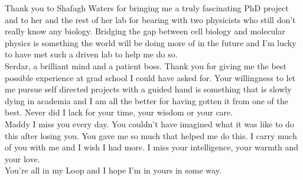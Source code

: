 Thank you to Shafagh Waters for bringing me a truly fascinating PhD project and to her and the rest of her lab for bearing with two physicists who still don't really know any biology. Bridging the gap between cell biology and molecular physics is something the world will be doing more of in the future and I'm lucky to have met such a driven lab to help me do so.  \\

Serdar, a brilliant mind and a patient boss. Thank you for giving me the best possible experience at grad school I could have asked for. Your willingness to let me pursue self directed projects with a guided hand is something that is slowly dying in academia and I am all the better for having gotten it from one of the best. Never did I lack for your time, your wisdom or your care. \\

Maddy I miss you every day. You couldn't have imagined what it was like to do this after losing you. You gave me so much that helped me do this. I carry much of you with me and I wish I had more. I miss your intelligence, your warmth and your love.\\

You're all in my Loop and I hope I'm in yours in some way.






